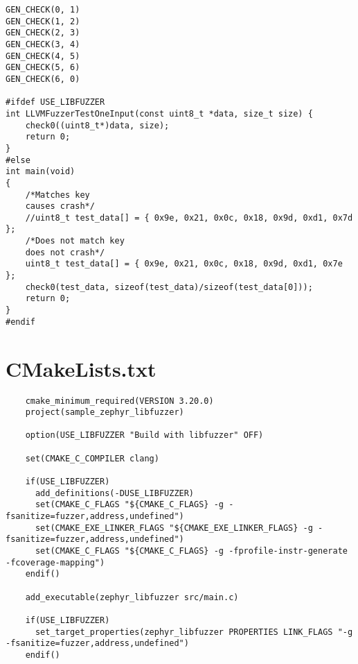 \begin{verbatim}
GEN_CHECK(0, 1)
GEN_CHECK(1, 2)
GEN_CHECK(2, 3)
GEN_CHECK(3, 4)
GEN_CHECK(4, 5)
GEN_CHECK(5, 6)
GEN_CHECK(6, 0)

#ifdef USE_LIBFUZZER
int LLVMFuzzerTestOneInput(const uint8_t *data, size_t size) {
    check0((uint8_t*)data, size);
    return 0;
}
#else
int main(void)
{
    /*Matches key
    causes crash*/
    //uint8_t test_data[] = { 0x9e, 0x21, 0x0c, 0x18, 0x9d, 0xd1, 0x7d };
    /*Does not match key
    does not crash*/
    uint8_t test_data[] = { 0x9e, 0x21, 0x0c, 0x18, 0x9d, 0xd1, 0x7e };
    check0(test_data, sizeof(test_data)/sizeof(test_data[0]));
    return 0;
}
#endif

\end{verbatim}

\section*{CMakeLists.txt}
\begin{verbatim}
    cmake_minimum_required(VERSION 3.20.0)
    project(sample_zephyr_libfuzzer)

    option(USE_LIBFUZZER "Build with libfuzzer" OFF)

    set(CMAKE_C_COMPILER clang)

    if(USE_LIBFUZZER)
      add_definitions(-DUSE_LIBFUZZER)
      set(CMAKE_C_FLAGS "${CMAKE_C_FLAGS} -g -fsanitize=fuzzer,address,undefined")
      set(CMAKE_EXE_LINKER_FLAGS "${CMAKE_EXE_LINKER_FLAGS} -g -fsanitize=fuzzer,address,undefined")
      set(CMAKE_C_FLAGS "${CMAKE_C_FLAGS} -g -fprofile-instr-generate -fcoverage-mapping")
    endif()

    add_executable(zephyr_libfuzzer src/main.c)

    if(USE_LIBFUZZER)
      set_target_properties(zephyr_libfuzzer PROPERTIES LINK_FLAGS "-g -fsanitize=fuzzer,address,undefined")
    endif()

\end{verbatim}